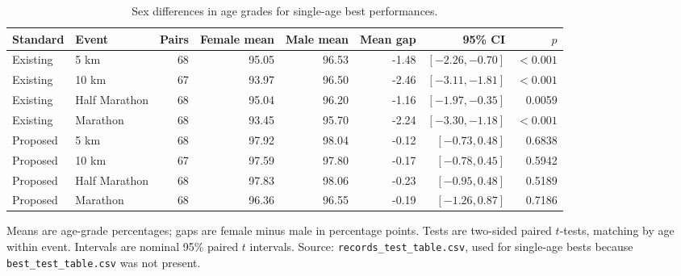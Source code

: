 \documentclass[11pt]{article}
\begin{document}
\clearpage
\begin{table}[htbp]
\centering
\small
\caption{Sex differences in age grades for single-age best performances.}
\label{tab:best-test-table}
\setlength{\tabcolsep}{4pt}
\begin{tabular}{llrrrrrr}
\toprule
Standard & Event & Pairs & Female mean & Male mean & Mean gap & 95\% CI & $p$ \\
\midrule
Existing & 5 km & 68 & 95.05 & 96.53 & -1.48 & $[-2.26, -0.70]$ & $<0.001$ \\
Existing & 10 km & 67 & 93.97 & 96.50 & -2.46 & $[-3.11, -1.81]$ & $<0.001$ \\
Existing & Half Marathon & 68 & 95.04 & 96.20 & -1.16 & $[-1.97, -0.35]$ & 0.0059 \\
Existing & Marathon & 68 & 93.45 & 95.70 & -2.24 & $[-3.30, -1.18]$ & $<0.001$ \\
Proposed & 5 km & 68 & 97.92 & 98.04 & -0.12 & $[-0.73, 0.48]$ & 0.6838 \\
Proposed & 10 km & 67 & 97.59 & 97.80 & -0.17 & $[-0.78, 0.45]$ & 0.5942 \\
Proposed & Half Marathon & 68 & 97.83 & 98.06 & -0.23 & $[-0.95, 0.48]$ & 0.5189 \\
Proposed & Marathon & 68 & 96.36 & 96.55 & -0.19 & $[-1.26, 0.87]$ & 0.7186 \\
\bottomrule
\end{tabular}
\par\medskip
\begin{minipage}{\textwidth}
\footnotesize
Means are age-grade percentages; gaps are female minus male in percentage points. Tests are two-sided paired $t$-tests, matching by age within event. Intervals are nominal 95\% paired $t$ intervals. Source: \texttt{records\_test\_table.csv}, used for single-age bests because \texttt{best\_test\_table.csv} was not present.
\end{minipage}
\end{table}
\end{document}
